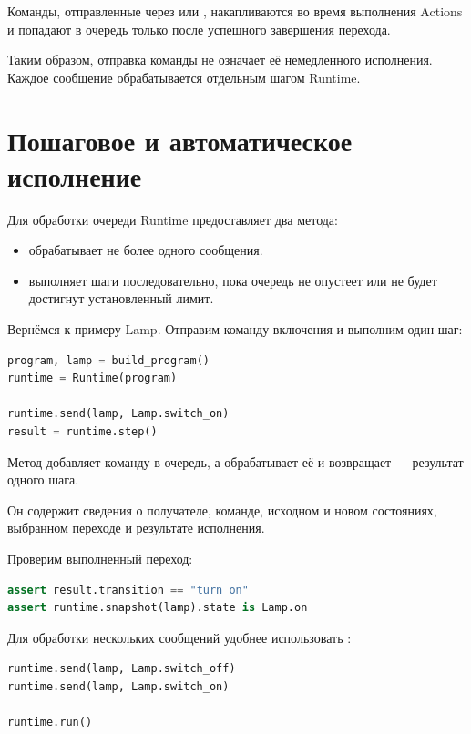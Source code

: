 Команды, отправленные через  или ,
накапливаются во время выполнения Actions и попадают
в очередь только после успешного завершения перехода.

Таким образом, отправка команды не означает её
немедленного исполнения. Каждое сообщение обрабатывается
отдельным шагом Runtime.

\section{Пошаговое и автоматическое исполнение}

Для обработки очереди Runtime предоставляет два метода:

\begin{itemize}
  \item {} обрабатывает не более одного сообщения.
  \item {} выполняет шаги последовательно,
    пока очередь не опустеет или не будет достигнут
    установленный лимит.
\end{itemize}

Вернёмся к примеру Lamp. Отправим команду включения
и выполним один шаг:

\begin{lstlisting}[language=Python,numbers=none]
program, lamp = build_program()
runtime = Runtime(program)

runtime.send(lamp, Lamp.switch_on)
result = runtime.step()
\end{lstlisting}

Метод  добавляет команду в очередь,
а  обрабатывает её и возвращает
 --- результат одного шага.

Он содержит сведения о получателе, команде, исходном
и новом состояниях, выбранном переходе и результате
исполнения.

Проверим выполненный переход:

\begin{lstlisting}[language=Python,numbers=none]
assert result.transition == "turn_on"
assert runtime.snapshot(lamp).state is Lamp.on
\end{lstlisting}

Для обработки нескольких сообщений удобнее
использовать :

\begin{lstlisting}[language=Python,numbers=none]
runtime.send(lamp, Lamp.switch_off)
runtime.send(lamp, Lamp.switch_on)

runtime.run()
\end{lstlisting}

